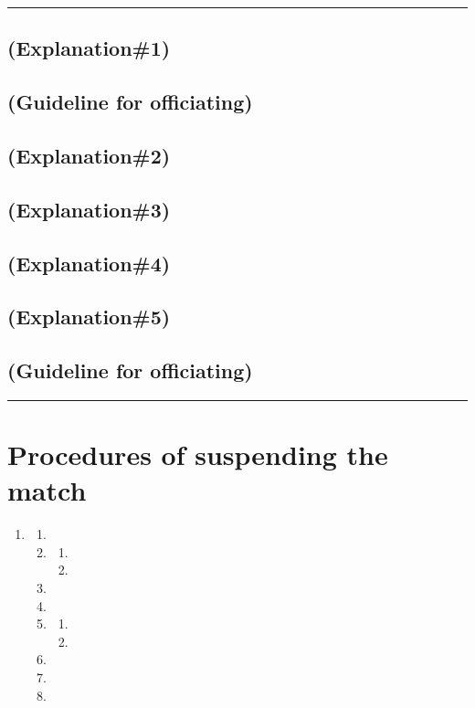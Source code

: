 \documentclass[draft]{report}
\newenvironment{expl}[0]%
  {\rule{\textwidth}{.2pt}\footnotesize}%
  {\rule{\textwidth}{.2pt}\normalsize}
\begin{document}
\begin{expl}
\section{(Explanation\#1)}

\section{(Guideline for officiating)}

\section{(Explanation\#2)}

\section{(Explanation\#3)}

\section{(Explanation\#4)}

\section{(Explanation\#5)}

\section{(Guideline for officiating)}

\end{expl}


\chapter{Procedures of suspending the match}\label{suspend}

\begin{enumerate}
\item

    \begin{enumerate}
    \item
    
    \item
    
        \begin{enumerate}
        \item
        
        \item
        
        \end{enumerate}
    \item
    
    \item
    
    \item
    
        \begin{enumerate}
        \item
        
        \item
        
        \end{enumerate}
    \item
    
    \item
    
    \item
    
    \end{enumerate}
\end{enumerate}
\end{document}

